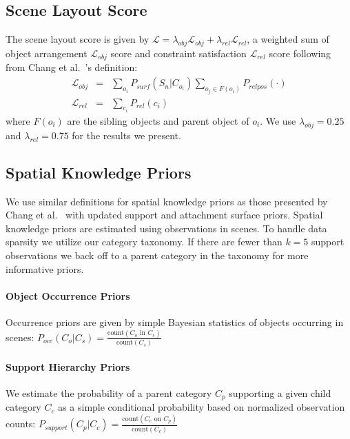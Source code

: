 \documentclass{sigchi}
\begin{document}
\appendix

\balance

\subsection{Scene Layout Score}
\label{app:layoutScore}

The scene layout score is given by $\mathcal{L} = \lambda_\textit{obj} \mathcal{L}_\textit{obj} + \lambda_\textit{rel} \mathcal{L}_\textit{rel}$, a weighted sum of object arrangement $\mathcal{L}_\textit{obj}$ score and constraint satisfaction $\mathcal{L}_\textit{rel}$ score following from Chang et al.~\cite{chang2014spatial}'s definition:
\begin{eqnarray*}
  \mathcal{L}_\textit{obj} &=& 
  \sum_{o_i} P_\textit{surf}(S_n|C_{o_i}) \sum_{o_j \in F(o_i) }P_\textit{relpos}(\cdot)\\
  \mathcal{L}_\textit{rel}&=&
  \sum_{c_i} P_\textit{rel}(c_i)
\end{eqnarray*}
where $F(o_i)$ are the sibling objects and parent object of $o_i$.  We use $\lambda_\textit{obj} = 0.25$ and $\lambda_\textit{rel} = 0.75$ for the results we present.

\subsection{Spatial Knowledge Priors}

We use similar definitions for spatial knowledge priors as those presented by Chang et al.~\cite{chang2014spatial} with updated support and attachment surface priors.  Spatial knowledge priors are estimated using observations in scenes. To handle data sparsity we utilize our category taxonomy.  If there are fewer than $k=5$ support observations we back off to a parent category in the taxonomy for more informative priors.

\paragraph{Object Occurrence Priors}
Occurrence priors are given by simple Bayesian statistics of objects occurring in scenes: $P_\textit{occ}(C_{o}|C_{s}) = \frac{\text{count}(C_{o} \text{~in~} C_{s})}{\text{count}(C_{s})}$

\paragraph{Support Hierarchy Priors}
We estimate the probability of a parent category $C_p$ supporting a given child category $C_c$ as a simple conditional probability based on normalized observation counts: $P_\textit{support}(C_{p}|C_{c}) = \frac{\text{count}(C_{c} \text{~on~} C_{p})}{\text{count}(C_{c})}$
\end{document}
